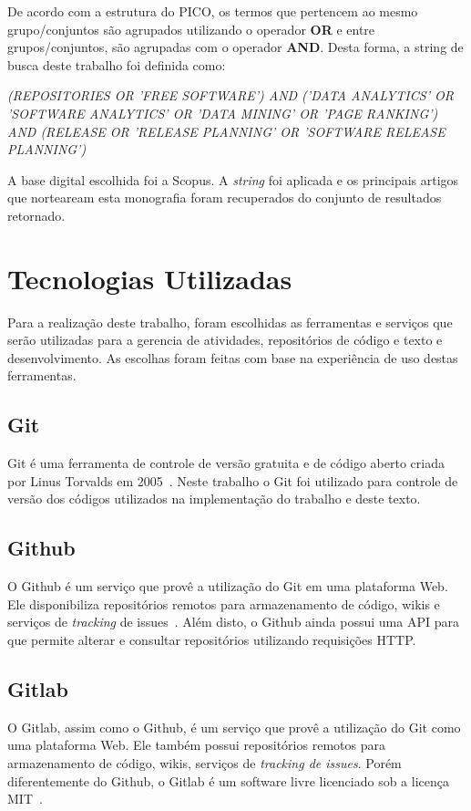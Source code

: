 De acordo com a estrutura do PICO, os termos que pertencem ao mesmo grupo/conjuntos são agrupados utilizando o operador \textbf{OR} e entre grupos/conjuntos, são agrupadas com o operador \textbf{AND}. Desta forma, a string de busca deste trabalho foi definida como:

\begin{center}
        \textit{(REPOSITORIES OR 'FREE SOFTWARE') AND ('DATA ANALYTICS' OR 'SOFTWARE ANALYTICS' OR 'DATA MINING' OR 'PAGE RANKING') AND (RELEASE OR 'RELEASE PLANNING' OR 'SOFTWARE RELEASE PLANNING')}
\end{center}

A base digital escolhida foi a Scopus. A \textit{string} foi aplicada e os principais artigos que norteaream esta monografia foram recuperados do conjunto de resultados retornado.

\section{Tecnologias Utilizadas}
\label{met:tec}
Para a realização deste trabalho, foram escolhidas as ferramentas e serviços que serão utilizadas para a gerencia de atividades, repositórios de código e texto e desenvolvimento. As escolhas foram feitas com base na experiência de uso destas ferramentas.

\subsection{Git}
\label{met:tec:git}
Git é uma ferramenta de controle de versão gratuita e de código aberto criada por Linus Torvalds em 2005~\cite{chacon}. Neste trabalho o Git foi utilizado para controle de versão dos códigos utilizados na implementação do trabalho e deste texto.

\subsection{Github}
\label{met:tec:github}
O Github é um serviço que provê a utilização do Git em uma plataforma Web. Ele disponibiliza repositórios remotos para armazenamento de código, wikis e serviços de \textit{tracking} de issues~\cite{github}. Além disto, o Github ainda possui uma API para que permite alterar e consultar repositórios utilizando requisições HTTP.

\subsection{Gitlab}
\label{met:tec:gitlab}
O Gitlab, assim como o Github, é um serviço que provê a utilização do Git como uma plataforma Web. Ele também possui repositórios remotos para armazenamento de código, wikis, serviços de \textit{tracking de issues}. Porém diferentemente do Github, o Gitlab é um software livre licenciado sob a licença MIT~\cite{gitlab}.


